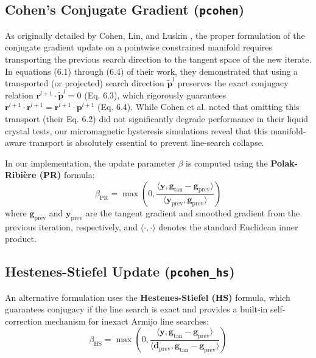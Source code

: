 \documentclass[11pt,a4paper]{article}
\begin{document}
\subsection{Cohen's Conjugate Gradient (\texttt{pcohen})}
As originally detailed by Cohen, Lin, and Luskin \cite{Cohen1989}, the proper formulation of the conjugate gradient update on a pointwise constrained manifold requires transporting the previous search direction to the tangent space of the new iterate. In equations (6.1) through (6.4) of their work, they demonstrated that using a transported (or projected) search direction $\tilde{\mathbf{p}}^l$ preserves the exact conjugacy relation $\mathbf{r}^{l+1} \cdot \tilde{\mathbf{p}}^l = 0$ (Eq. 6.3), which rigorously guarantees $\mathbf{r}^{l+1} \cdot \mathbf{r}^{l+1} = \mathbf{r}^{l+1} \cdot \mathbf{p}^{l+1}$ (Eq. 6.4). While Cohen et al. noted that omitting this transport (their Eq. 6.2) did not significantly degrade performance in their liquid crystal tests, our micromagnetic hysteresis simulations reveal that this manifold-aware transport is absolutely essential to prevent line-search collapse.

In our implementation, the update parameter $\beta$ is computed using the \textbf{Polak-Ribière (PR)} formula:
\begin{equation}
    \beta_{\text{PR}} = \max\left(0, \frac{\langle \mathbf{y}, \mathbf{g}_{\text{tan}} - \mathbf{g}_{\text{prev}} \rangle}{\langle \mathbf{y}_{\text{prev}}, \mathbf{g}_{\text{prev}} \rangle} \right)
\end{equation}
where $\mathbf{g}_{\text{prev}}$ and $\mathbf{y}_{\text{prev}}$ are the tangent gradient and smoothed gradient from the previous iteration, respectively, and $\langle \cdot, \cdot \rangle$ denotes the standard Euclidean inner product.

\subsection{Hestenes-Stiefel Update (\texttt{pcohen\_hs})}
An alternative formulation uses the \textbf{Hestenes-Stiefel (HS)} formula, which guarantees conjugacy if the line search is exact and provides a built-in self-correction mechanism for inexact Armijo line searches:
\begin{equation}
    \beta_{\text{HS}} = \max\left(0, \frac{\langle \mathbf{y}, \mathbf{g}_{\text{tan}} - \mathbf{g}_{\text{prev}} \rangle}{\langle \mathbf{d}_{\text{prev}}, \mathbf{g}_{\text{tan}} - \mathbf{g}_{\text{prev}} \rangle} \right)
\end{equation}
\end{document}
